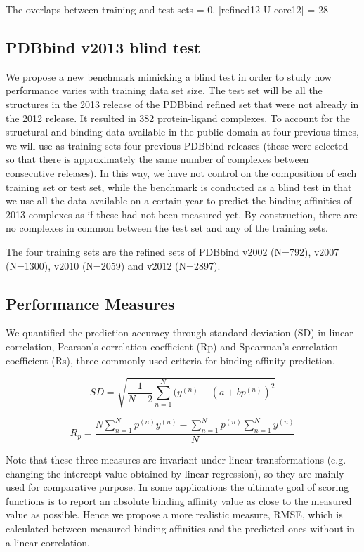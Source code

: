 \documentclass[journal=jacsat,manuscript=article]{achemso}
\begin{document}
The overlaps between training and test sets = 0. |refined12 U core12| = 28

\subsection{PDBbind v2013 blind test}

We propose a new benchmark mimicking a blind test in order to study how performance varies with training data set size. The test set will be all the structures in the 2013 release of the PDBbind refined set that were not already in the 2012 release. It resulted in 382 protein-ligand complexes. To account for the structural and binding data available in the public domain at four previous times, we will use as training sets four previous PDBbind releases (these were selected so that there is approximately the same number of complexes between consecutive releases). In this way, we have not control on the composition of each training set or test set, while the benchmark is conducted as a blind test in that we use all the data available on a certain year to predict the binding affinities of 2013 complexes as if these had not been measured yet. By construction, there are no complexes in common between the test set and any of the training sets. 

The four training sets are the refined sets of PDBbind v2002 (N=792), v2007 (N=1300), v2010 (N=2059) and v2012 (N=2897).

\subsection{Performance Measures}

We quantified the prediction accuracy through standard deviation (SD) in linear correlation, Pearson's correlation coefficient (Rp) and Spearman's correlation coefficient (Rs), three commonly used criteria for binding affinity prediction.

\begin{equation}
SD = \sqrt{\frac{1}{N-2}\sum_{n=1}^N(y^{(n)}-(a+bp^{(n)})^2}
\label{eqn:sd}
\end{equation}

\begin{equation}
R_p = \frac{N\sum_{n=1}^Np^{(n)}y^{(n)}-\sum_{n=1}^Np^{(n)}\sum_{n=1}^Ny^{(n)}}{N}
\label{eqn:rp}
\end{equation}

Note that these three measures are invariant under linear transformations (e.g. changing the intercept value obtained by linear regression), so they are mainly used for comparative purpose. In some applications the ultimate goal of scoring functions is to report an absolute binding affinity value as close to the measured value as possible. Hence we propose a more realistic measure, RMSE, which is calculated between measured binding affinities and the predicted ones without in a linear correlation.
\end{document}
